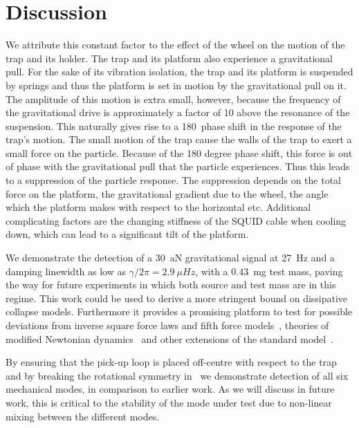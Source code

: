 \documentclass[pdflatex,sn-mathphys]{sn-jnl}
\begin{document}
\section{Discussion}\label{sec:conclusions}    
    We attribute this constant factor to the effect of the wheel on the motion of the trap and its holder. The trap and its platform also experience a gravitational pull.  For the sake of its vibration isolation, the trap and its platform is suspended by springs and thus the platform is set in motion by the gravitational pull on it. The amplitude of this motion is extra small, however, because the frequency of the gravitational drive is approximately a factor of 10 above the resonance of the suspension. This naturally gives rise to a 180\textdegree\ phase shift in the response of the trap's motion. The small motion of the trap cause the walls of the trap to exert a small force on the particle. Because of the 180 degree phase shift, this force is out of phase with the gravitational pull that the particle experiences. Thus this leads to a suppression of the particle response. The suppression depends on the total force on the platform, the gravitational gradient due to the wheel, the angle which the platform makes with respect to the horizontal etc. Additional complicating factors are the changing stiffness of the SQUID cable when cooling down, which can lead to a significant tilt of the platform. 
    
%


    We demonstrate the detection of a \SI{30}{aN} gravitational signal at \SI{27}{Hz} and a damping linewidth as low as $\gamma/2\pi = \SI{2.9}{\mu Hz}$, with a \SI{0.43}{mg} test mass, paving the way for future experiments in which both source and test mass are in this regime. This work could be used to derive a more stringent bound on dissipative collapse models. Furthermore it provides a promising platform to test for possible deviations from inverse square force laws and fifth force models~\cite{Blakemore2021, smullin2005}, theories of modified Newtonian dynamics~\cite{milgrom1983, bekenstein2004} and other extensions of the standard model~\cite{carney2021}.
    
    By ensuring that the pick-up loop is placed off-centre with respect to the trap and by breaking the rotational symmetry in \textgamma\ we demonstrate detection of all six mechanical modes, in comparison to earlier work. As we will discuss in future work, this is critical to the stability of the mode under test due to non-linear mixing between the different modes.
    
\end{document}
